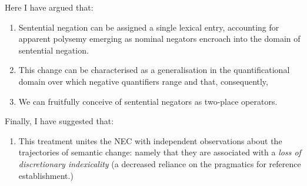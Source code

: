Here I have argued that: 
\begin{enumerate}[\bf 1 ]
	\item Sentential negation can be assigned a single lexical entry, accounting for apparent poly\-semy emerging as nominal negators encroach into the domain of sentential negation. \item This change can be characterised as a generalisation in the quantificational domain over which negative quantifiers range and that, consequently, 
	\item  We can fruitfully conceive of sentential negators as two-place operators.
\end{enumerate}
Finally, I have suggested that:
\begin{enumerate}[\bf 4 ]
	\item This treatment unites the NEC with independent observations about the trajectories of semantic change: namely that they are associated with a \textit{loss of discretionary indexicality} (a decreased reliance on the pragmatics for reference establishment.)
\end{enumerate}

